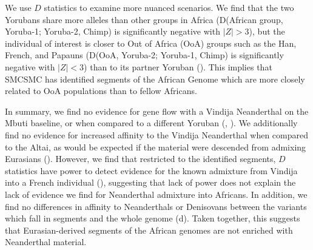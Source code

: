 We use $D$ statistics to examine more nuanced scenarios. We find that the two Yorubans share more alleles than other groups in Africa (D(African group, Yoruba-1; Yoruba-2, Chimp) is significantly negative with $|Z|>3$), but the individual of interest is closer to Out of Africa (OoA) groups such as the Han, French, and Papauns (D(OoA, Yoruba-2; Yoruba-1, Chimp) is significantly negative with $|Z|<3$) than to its partner Yoruban (). This implies that SMCSMC has identified segments of the African Genome which are more closely related to OoA populations than to fellow Africans.   


In summary, we find no evidence for gene flow with a Vindija Neanderthal on the Mbuti baseline, or when compared to a different Yoruban (, ). We additionally find no evidence for increased affinity to the Vindija Neanderthal when compared to the Altai, as would be expected if the material were descended from admixing Eurasians (). However, we find that restricted to the identified segments, $D$ statistics have power to detect evidence for the known admixture from Vindija into a French individual (), suggesting that lack of power does not explain the lack of evidence we find for Neanderthal admixture into Africans.  In addition, we find no differences in affinity to Neanderthals or Denisovans between the variants which fall in segments and the whole genome (d). Taken together, this suggests that Eurasian-derived segments of the African genomes are not enriched with Neanderthal material.


